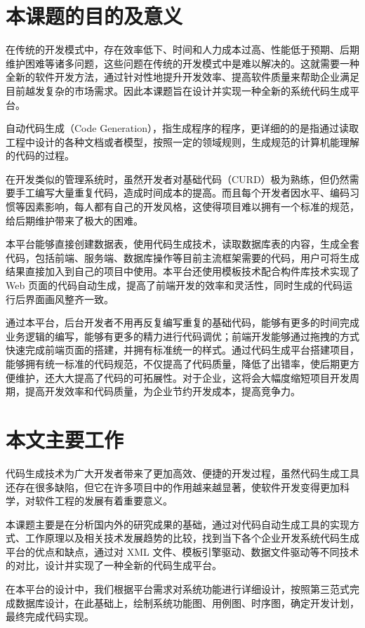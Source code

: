 \documentclass{izdthesis}
\begin{document}
\section{本课题的目的及意义}
在传统的开发模式中，存在效率低下、时间和人力成本过高、性能低于预期、后期维护困难等诸多问题，这些问题在传统的开发模式中是难以解决的。这就需要一种全新的软件开发方法，通过针对性地提升开发效率、提高软件质量来帮助企业满足目前越发复杂的市场需求。因此本课题旨在设计并实现一种全新的系统代码生成平台。

自动代码生成（Code Generation），指生成程序的程序，更详细的的是指通过读取工程中设计的各种文档或者模型，按照一定的领域规则，生成规范的计算机能理解的代码的过程\cite{ref12}。

在开发类似的管理系统时，虽然开发者对基础代码（CURD）极为熟练，但仍然需要手工编写大量重复代码，造成时间成本的提高。而且每个开发者因水平、编码习惯等因素影响，每人都有自己的开发风格，这使得项目难以拥有一个标准的规范，给后期维护带来了极大的困难。

本平台能够直接创建数据表，使用代码生成技术，读取数据库表的内容，生成全套代码，包括前端、服务端、数据库操作等目前主流框架需要的代码\cite{ref13}，用户可将生成结果直接加入到自己的项目中使用。本平台还使用模板技术配合构件库技术实现了 Web 页面的代码自动生成，提高了前端开发的效率和灵活性\cite{ref14}，同时生成的代码运行后界面画风整齐一致\cite{ref15}。

通过本平台，后台开发者不用再反复编写重复的基础代码，能够有更多的时间完成业务逻辑的编写，能够有更多的精力进行代码调优；前端开发能够通过拖拽的方式快速完成前端页面的搭建，并拥有标准统一的样式。通过代码生成平台搭建项目，能够拥有统一标准的代码规范，不仅提高了代码质量，降低了出错率\cite{ref16}，使后期更方便维护，还大大提高了代码的可拓展性。对于企业，这将会大幅度缩短项目开发周期，提高开发效率和代码质量，为企业节约开发成本，提高竞争力。

\section{本文主要工作}
代码生成技术为广大开发者带来了更加高效、便捷的开发过程，虽然代码生成工具还存在很多缺陷，但它在许多项目中的作用越来越显著，使软件开发变得更加科学，对软件工程的发展有着重要意义。

本课题主要是在分析国内外的研究成果的基础，通过对代码自动生成工具的实现方式、工作原理以及相关技术发展趋势的比较，找到当下各个企业开发系统代码生成平台的优点和缺点，通过对 XML 文件、模板引擎驱动、数据文件驱动等不同技术的对比，设计并实现了一种全新的代码生成平台。

在本平台的设计中，我们根据平台需求对系统功能进行详细设计，按照第三范式完成数据库设计，在此基础上，绘制系统功能图、用例图、时序图，确定开发计划，最终完成代码实现。
\end{document}
